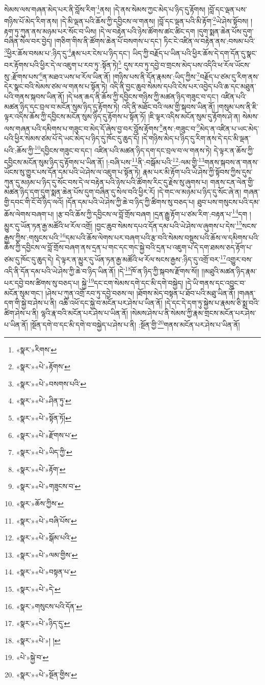 སེམས་ལས་གཞན་མེད་པར་ནི་བློས་རིག་\footnote{«སྣར་»རིགས་}ནས། །དེ་ནས་སེམས་ཀྱང་མེད་པ་ཉིད་དུ་རྟོགས། །བློ་དང་ལྡན་པས་གཉིས་པོ་མེད་རིག་ནས། །དེ་མི་ལྡན་པའི་ཆོས་ཀྱི་དབྱིངས་ལ་གནས། །བློ་དང་ལྡན་པའི་མི་རྟོག་\footnote{«སྣར་»«པེ་»རྟོགས་}ཡེ་ཤེས་སྟོབས། །རྟག་ཏུ་ཀུན་ནས་མཉམ་པར་སོང་བ་ཡིས། །དེ་ལ་བརྟེན་པའི་ཉེས་ཚོགས་ཚང་ཚིང་དག །དུག་སྨན་ཆེན་པོས་དུག་བཞིན་སེལ་བར་བྱེད། །གཅིག་གིས་ནི་ཚོགས་ཆེན་པོ་བསགས་པ་དང་། ཏིང་ངེ་འཛིན་ལ་བརྟེན་ནས་:བསམ་པའི་\footnote{«སྣར་»«པེ་»བསགས་པའི་}ཕྱིར་ཆོས་བསམ་པ་:ཉིད་དུ་\footnote{«སྣར་»«པེ་»ཤིན་ཏུ་}རྣམ་པར་ངེས་པ་ཉིད་དང་། ཡིད་ཀྱི་བརྗོད་པ་ཡིན་པའི་ཕྱིར་ཆོས་དེ་དག་དོན་དུ་སྣང་བར་རྟོགས་པའི་ཕྱིར་དེ་ལ་འཇུག་པ་རབ་ཏུ་:སྟོན་ཏེ།\footnote{«སྣར་»«པེ་»སྟོན་ཏོ།} དུས་རབ་ཏུ་དབྱེ་བ་གྲངས་མེད་པས་འདིའི་ཕ་རོལ་ཡོངས་སུ་:རྫོགས་པས་\footnote{«སྣར་»«པེ་»རྫོགས་པ་}ན་མཐའ་ཡས་ཕ་རོལ་ཡིན་ནོ། །གཉིས་པས་ནི་དོན་རྣམས་:ཡིད་ཀྱིས་\footnote{«སྣར་»«པེ་»ཡིད་ཀྱི་}བརྗོད་པ་ཙམ་དུ་རིག་ནས་དེར་སྣང་བའི་སེམས་ཙམ་ལ་གནས་པ་སྟོན་ཏེ། འདི་ནི་བྱང་ཆུབ་སེམས་དཔའི་ངེས་པར་འབྱེད་པའི་ཆ་དང་མཐུན་པའི་གནས་སྐབས་ཡིན་ནོ། །དེ་ཕན་ཆད་ནི་ཆོས་ཀྱི་དབྱིངས་གཉིས་ཀྱི་མཚན་ཉིད་གཟུང་བ་དང་། འཛིན་པའི་མཚན་ཉིད་དང་བྲལ་བ་མངོན་སུམ་ཉིད་དུ་རྟོགས་ཏེ། འདི་ནི་མཐོང་བའི་ལམ་གྱི་སྐབས་ཡིན་ནོ། །གསུམ་པས་ནི་ཇི་ལྟར་འདིས་ཆོས་ཀྱི་དབྱིངས་མངོན་སུམ་ཉིད་དུ་རྟོགས་པ་སྟོན་ཏོ། །ཇི་ལྟར་འདིས་མངོན་སུམ་དུ་རྟོགས་ཤེ་ན། སེམས་ལས་གཞན་པའི་དམིགས་པ་གཟུང་བ་མེད་དོ་ཞེས་བྱ་བར་བློས་རྟོགས་\footnote{«སྣར་»«པེ་»རྟོག་}ནས་:གཟུང་བ་\footnote{«སྣར་»«པེ་»གཟུངས་བ་}མེད་ན་འཛིན་པ་ཡང་མེད་པའི་ཕྱིར་སེམས་ཙམ་པོ་དེ་ཡང་མེད་པ་ཉིད་དུ་ཁོང་དུ་ཆུད་དོ། །དེ་གཉིས་མེད་པ་ཉིད་དུ་རིག་ནས་དེ་དང་མི་ལྡན་པའི་:ཆོས་ཀྱི་\footnote{«སྣར་»ཆོས་ཀྱིས་}དབྱིངས་གཟུང་བ་དང་། འཛིན་པའི་མཚན་ཉིད་དག་དང་བྲལ་བ་ལ་གནས་ཏེ། དེ་ལྟར་ན་ཆོས་ཀྱི་དབྱིངས་མངོན་སུམ་ཉིད་དུ་རྟོགས་པ་ཡིན་ནོ། །:བཞི་པས་\footnote{«སྣར་»«པེ་»བཞི་པོས་}ནི་:བསྒོམ་པའི་\footnote{«སྣར་»«པེ་»སྒོམ་པའི་}:ལམ་གྱི་\footnote{«སྣར་»«པེ་»ལམ་གྱིས་}གནས་སྐབས་ན་གནས་ཡོངས་སུ་གྱུར་པས་དོན་དམ་པའི་ཡེ་ཤེས་ལ་འཇུག་པ་སྟོན་ཏེ། རྣམ་པར་མི་རྟོག་པའི་ཡེ་ཤེས་ཀྱི་སྟོབས་ཀྱིས་དུས་ཀུན་དུ་མཉམ་པ་ཉིད་དུ་སོང་བས་དེ་ལ་བརྟེན་པའི་ཉེས་པའི་ཚོགས་རིང་དུ་རྗེས་སུ་ཞུགས་པ། གནས་ངན་ལེན་གྱི་མཚན་ཉིད་དག་དུག་སྨན་ཆེན་པོས་དུག་བཞིན་དུ་སེལ་བའི་ཕྱིར་རོ། །དེ་གང་ལ་མཉམ་པ་ཉིད་དུ་སོང་ཞེ་ན། གཞན་གྱི་དབང་གི་ངོ་བོ་ཉིད་ལའོ། །དོན་དམ་པའི་ཡེ་ཤེས་ཀྱི་ཆེ་བ་ཉིད་ཀྱི་ཚིགས་སུ་བཅད་པ། ཐུབ་པས་གསུངས་པའི་དམ་ཆོས་ལེགས་བཞག་པ། །རྩ་བའི་ཆོས་ཀྱི་དབྱིངས་ལ་བློ་གྲོས་བཞག །དྲན་རྒྱུ་རྟོག་པ་ཙམ་རིག་:བརྟན་པ་\footnote{«སྣར་»«པེ་»བསྟན་པ་}དག །མྱུར་དུ་ཡོན་ཏན་རྒྱ་མཚོའི་ཕ་རོལ་འགྲོ། །བྱང་ཆུབ་སེམས་དཔའ་དོན་དམ་པའི་ཡེ་ཤེས་ལ་ཞུགས་པ་དེས་\footnote{«སྣར་»«པེ་»དེ་}སངས་རྒྱས་ཀྱིས་:གསུངས་པའི་\footnote{«སྣར་»གསུངས་པའི་དོན་}དམ་པའི་ཆོས་ལེགས་པར་བཞག་པའི་རྩ་བའི་སེམས་བསྡུས་པའི་ཆོས་ལ་དམིགས་པའི་ཆོས་ཀྱི་དབྱིངས་ལ་བློ་གྲོས་བཞག་ནས་དྲན་པ་གང་དང་གང་སྐྱེ་བའི་དྲན་པ་འཇུག་པ་དེ་དག་ཐམས་ཅད་རྟོག་པ་ཙམ་དུ་ཁོང་དུ་ཆུད་དེ། དེ་ལྟར་ན་མྱུར་དུ་ཡོན་ཏན་རྒྱ་མཚོའི་ཕ་རོལ་སངས་རྒྱས་:ཉིད་དུ་འགྲོ་བར་\footnote{«སྣར་»«པེ་»ཉིད་དུ་}འགྱུར་བས་འདི་ནི་དོན་དམ་པའི་ཡེ་ཤེས་ཀྱི་ཆེ་བ་ཉིད་ཡིན་ནོ། །དེ་\footnote{«སྣར་»«པེ་»། །}ཁོ་ན་ཉིད་ཀྱི་སྐབས་རྫོགས་སོ།། །།མཐུའི་མཚན་ཉིད་རྣམ་པར་དབྱེ་བས་ཚིགས་སུ་བཅད་པ། སྐྱེ་\footnote{«པེ་»སྐྱེ་བ་}དང་ངག་སེམས་དགེ་དང་མི་དགེ་བསྐྱེད། །དེ་ཡི་གནས་དང་འབྱུང་བ་མངོན་སུམ་གང་། །ཤེས་པ་ཀུན་འགྲོ་རབ་ཏུ་དབྱེ་བཅས་ལ། །ཐོགས་མེད་བསྟན་པ་ཐོབ་པའི་མཐུ་ཡིན་ནོ། །གཞན་དག་གི་སྐྱེ་བ་ཤེས་པ་ནི། འཆི་འཕོ་དང་སྐྱེ་བ་མངོན་པར་ཤེས་པ་ཡིན་ནོ། །དེ་དང་དེ་དག་ཏུ་སྐྱེས་པ་རྣམས་ཅི་སྨྲ་བའི་ཚིག་ཤེས་པ་ནི། ལྷའི་རྣ་བའི་མངོན་པར་ཤེས་པ་ཡིན་ནོ། །སེམས་ཤེས་པ་ནི་སེམས་ཀྱི་རྣམ་གྲངས་མངོན་པར་ཤེས་པ་ཡིན་ནོ། །སྔོན་དགེ་བ་དང་མི་དགེ་བ་བསྐྱེད་པ་ཤེས་པ་ནི། :སྔོན་གྱི་\footnote{«སྣར་»«པེ་»སྔོན་གྱིས་}གནས་མངོན་པར་ཤེས་པ་ཡིན་ནོ། 